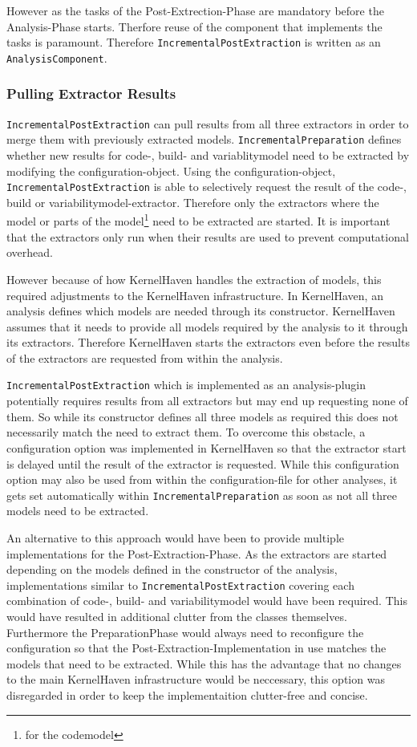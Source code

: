 \documentclass[a4paper]{article}
\begin{document}
However as the tasks of the Post-Extrection-Phase are mandatory before the Analysis-Phase starts. Therfore reuse of the component that implements the tasks is paramount. Therefore \texttt{IncrementalPostExtraction} is written as an \texttt{AnalysisComponent}.

\subsubsection{Pulling Extractor Results}

\texttt{IncrementalPostExtraction} can pull results from all three extractors in order to merge them with previously extracted models. \texttt{IncrementalPreparation} defines whether new results for code-, build- and variablitymodel need to be extracted by modifying the configuration-object. Using the configuration-object, \texttt{IncrementalPostExtraction} is able to selectively request the result of the code-, build or variabilitymodel-extractor. Therefore only the extractors where the model or parts of the model\footnote{for the codemodel} need to be extracted are started. It is important that the extractors only run when their results are used to prevent computational overhead.

However because of how KernelHaven handles the extraction of models, this required adjustments to the KernelHaven infrastructure. In KernelHaven, an analysis defines which models are needed through its constructor. KernelHaven assumes that it needs to provide all models required by the analysis to it through its extractors. Therefore KernelHaven starts the extractors even before the results of the extractors are requested from within the analysis. 

\texttt{IncrementalPostExtraction} which is implemented as an analysis-plugin potentially requires results from all extractors but may end up requesting none of them. So while its constructor defines all three models as required this does not necessarily match the need to extract them. To overcome this obstacle, a configuration option was implemented in KernelHaven so that the extractor start is delayed until the result of the extractor is requested. While this configuration option may also be used from within the configuration-file for other analyses, it gets set automatically within \texttt{IncrementalPreparation} as soon as not all three models need to be extracted.

An alternative to this approach would have been to provide multiple implementations for the Post-Extraction-Phase. As the extractors are started depending on the models defined in the constructor of the analysis, implementations similar to \texttt{IncrementalPostExtraction} covering each combination of code-, build- and variabilitymodel would have been required. This would have resulted in additional clutter from the classes themselves. Furthermore the PreparationPhase would always need to reconfigure the configuration so that the Post-Extraction-Implementation in use matches the models that need to be extracted. While this has the advantage that no changes to the main KernelHaven infrastructure would be neccessary, this option was disregarded in order to keep the implementaition clutter-free and concise.
\end{document}
